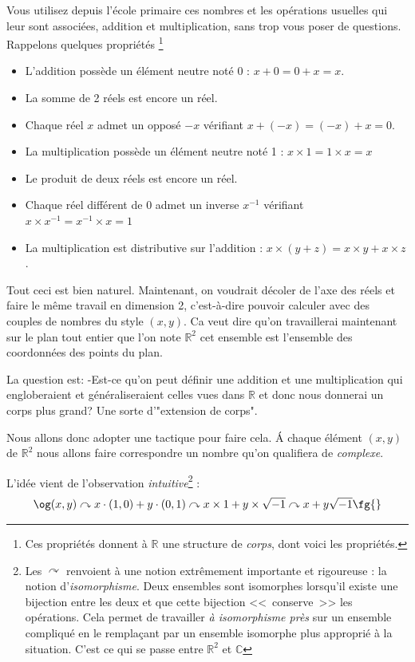 \documentclass[french]{book}
\newcommand{\bbr}{\mathbb {R}}
\newcommand{\bbc}{\mathbb {C}}
\begin{document}
Vous  utilisez depuis  l'école primaire  ces nombres  et  les opérations
usuelles qui leur sont  associées, addition et multiplication, sans trop
vous  poser  de  questions.\\
 
 Rappelons  quelques  propriétés \footnote{Ces
  propriétés donnent à $\bbr$ une structure de \textit{corps}, dont voici les propriétés.}
  
\begin{itemize}
\item[$\bullet$] L'addition possède un élément neutre noté 0 : $x+0=0+x=x$.
\item[$\bullet$] La somme de 2 réels est encore un réel.
\item[$\bullet$] Chaque réel $x$ admet un opposé $-x$ vérifiant $x+(-x)=(-x)+x=0$.
\item[$\bullet$]  La multiplication  possède un  élément neutre  noté 1  : $x\times
  1=1\times x=x$ 
\item[$\bullet$] Le produit de deux réels est encore un réel.
\item[$\bullet$] Chaque  réel différent  de 0 admet  un inverse  $x^{-1}$ vérifiant
  $x\times x^{-1}=x^{-1}\times x=1$ 
\item[$\bullet$]   La   multiplication    est   distributive   sur   l'addition   :
  $x\times(y+z)=x\times y + x\times z$. 
\end{itemize}

Tout ceci est bien naturel. Maintenant, on voudrait décoler de l'axe des
réels  et faire  le même  travail en  dimension 2,  c'est-à-dire pouvoir
calculer avec des couples de nombres du style $(x,y)$. Ca veut dire qu'on travaillerai maintenant sur le plan tout entier que l'on  note   $\bbr^2$  cet  ensemble  est  l'ensemble  des coordonnées des points du plan.

La question est: -Est-ce qu'on peut définir une addition
et une multiplication qui  engloberaient et généraliseraient celles vues
dans $\bbr$ et donc nous donnerai un corps plus grand? Une sorte d'"extension de corps". 

Nous allons donc adopter une tactique pour faire cela.  \'A chaque  élément  $(x,y)$ de  $\bbr^2$  nous allons  faire correspondre un nombre qu'on qualifiera de \textit{complexe}. 

L'idée    vient    de   l'observation    \textit{intuitive}\footnote{Les
  $\curvearrowright$  renvoient à une  notion extrêmement  importante et
  rigoureuse  : la notion  d'\textit{isomorphisme}. Deux  ensembles sont
  isomorphes lorsqu'il existe une bijection  entre les deux et que cette
  bijection  <<~conserve~>> les  opérations. Cela  permet  de travailler
  \textit{à  isomorphisme   près}  sur  un  ensemble   compliqué  en  le
  remplaçant   par   un  ensemble   isomorphe   plus   approprié  à   la
  situation.  C'est ce  qui se  passe entre  $\bbr^2$ et  $\bbc$}  : \[\og
(x,y)\curvearrowright  x\cdot(1,0)+y\cdot (0,1)\curvearrowright x\times
1+y\times \sqrt{-1}\curvearrowright x+y\sqrt{-1}\fg{}\]
\end{document}
